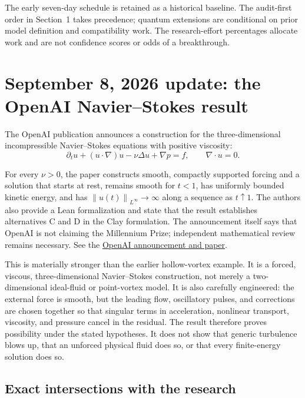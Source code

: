 \documentclass[11pt]{article}
\newcommand{\norm}[1]{\left\lVert #1 \right\rVert}
\theoremstyle{definition}
\theoremstyle{plain}
\theoremstyle{remark}
\begin{document}
The early seven-day schedule is retained as a historical baseline. The audit-first order in Section~1 takes precedence; quantum extensions are conditional on prior model definition and compatibility work. The research-effort percentages allocate work and are not confidence scores or odds of a breakthrough.

\section{September 8, 2026 update: the OpenAI Navier--Stokes result}

The OpenAI publication announces a construction for the three-dimensional incompressible Navier--Stokes equations with positive viscosity:
\begin{equation}
  \partial_t u+(u\cdot\nabla)u-\nu\Delta u+\nabla p=f,
  \qquad \nabla\cdot u=0.
  \label{eq:navier-stokes}
\end{equation}

For every $\nu>0$, the paper constructs smooth, compactly supported forcing and a solution that starts at rest, remains smooth for $t<1$, has uniformly bounded kinetic energy, and has $\norm{u(t)}_{L^\infty}\to\infty$ along a sequence as $t\uparrow1$. The authors also provide a Lean formalization and state that the result establishes alternatives C and D in the Clay formulation. The announcement itself says that OpenAI is not claiming the Millennium Prize; independent mathematical review remains necessary. See the \href{https://openai.com/index/navier-stokes-solution/}{OpenAI announcement and paper}.

This is materially stronger than the earlier hollow-vortex example. It is a forced, viscous, three-dimensional Navier--Stokes construction, not merely a two-dimensional ideal-fluid or point-vortex model. It is also carefully engineered: the external force is smooth, but the leading flow, oscillatory pulses, and corrections are chosen together so that singular terms in acceleration, nonlinear transport, viscosity, and pressure cancel in the residual. The result therefore proves possibility under the stated hypotheses. It does not show that generic turbulence blows up, that an unforced physical fluid does so, or that every finite-energy solution does so.

\subsection{Exact intersections with the research}
\end{document}
